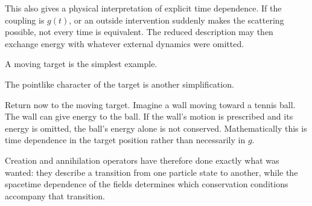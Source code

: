 This also gives a physical interpretation of explicit time dependence. If the coupling is \(g(t)\), or an outside intervention suddenly makes the scattering possible, not every time is equivalent. The reduced description may then exchange energy with whatever external dynamics were omitted.

\begin{classroomqa}
\end{classroomqa}

A moving target is the simplest example.

\begin{classroomqa}
\end{classroomqa}

The pointlike character of the target is another simplification.

\begin{classroomqa}
\end{classroomqa}

Return now to the moving target. Imagine a wall moving toward a tennis ball. The wall can give energy to the ball. If the wall's motion is prescribed and its energy is omitted, the ball's energy alone is not conserved. Mathematically this is time dependence in the target position rather than necessarily in \(g\).

Creation and annihilation operators have therefore done exactly what was wanted: they describe a transition from one particle state to another, while the spacetime dependence of the fields determines which conservation conditions accompany that transition.

